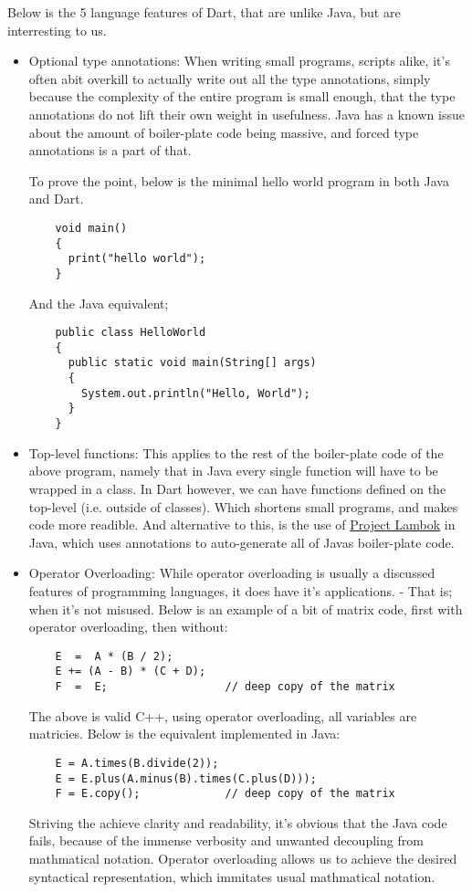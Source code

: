 Below is the 5 language features of Dart, that are unlike Java, but
are interresting to us.

\begin{itemize}
\item Optional type annotations: When writing small programs, scripts
  alike, it's often abit overkill to actually write out all the type
  annotations, simply because the complexity of the entire program is
  small enough, that the type annotations do not lift their own weight
  in usefulness.  Java has a known issue about the amount of
  boiler-plate code being massive, and forced type annotations is a
  part of that.

  To prove the point, below is the minimal hello world program in both
  Java and Dart.
  \begin{verbatim}
    void main()
    {
      print("hello world");
    }
  \end{verbatim}
  And the Java equivalent;
  \begin{verbatim}
    public class HelloWorld
    {
      public static void main(String[] args)
      {
        System.out.println("Hello, World");
      }
    }
  \end{verbatim}

\item Top-level functions: This applies to the rest of the
  boiler-plate code of the above program, namely that in Java every
  single function will have to be wrapped in a class.  In Dart
  however, we can have functions defined on the top-level
  (i.e. outside of classes). Which shortens small programs, and makes
  code more readible.  And alternative to this, is the use of
  \href{http://projectlombok.org}{Project Lambok} in Java, which uses
  annotations to auto-generate all of Javas boiler-plate code.

\item Operator Overloading: While operator overloading is usually a
  discussed features of programming languages, it does have it's
  applications. - That is; when it's not misused.  Below is an example
  of a bit of matrix code, first with operator overloading, then
  without:
  \begin{verbatim}
    E  =  A * (B / 2);
    E += (A - B) * (C + D);
    F  =  E;                  // deep copy of the matrix
  \end{verbatim}
  The above is valid C++, using operator overloading, all variables
  are matricies. Below is the equivalent implemented in Java:
  \begin{verbatim}
    E = A.times(B.divide(2));
    E = E.plus(A.minus(B).times(C.plus(D)));
    F = E.copy();             // deep copy of the matrix
  \end{verbatim}
  Striving the achieve clarity and readability, it's obvious that the
  Java code fails, because of the immense verbosity and unwanted
  decoupling from mathmatical notation.  Operator overloading allows
  us to achieve the desired syntactical representation, which
  immitates usual mathmatical notation.


\end{itemize}
